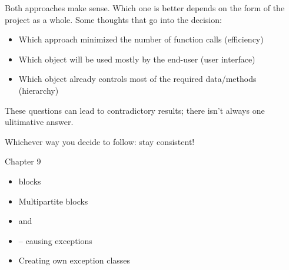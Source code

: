 \begin{frame}
%
\begin{hintbox}
Both approaches make sense. Which one is better depends on the form of the project as a whole. Some thoughts that go into the decision:

\vspace{6pt}
\begin{itemize}
\item Which approach minimized the number of function calls (\thus efficiency)
\item Which object will be used mostly by the end-user (\thus user interface)
\item Which object already controls most of the required data/methods \\
	(\thus hierarchy)
\end{itemize}

\vspace{6pt}
These questions can lead to contradictory results; there isn't always one ulitimative answer.

\vspace{6pt}
Whichever way you decide to follow: stay consistent!
\end{hintbox}
%
\end{frame}


\begin{frame}[fragile]{Chapter 9}
%
\begin{itemize}
\item {} blocks
\item Multipartite  blocks
\item {} and 
\item {} -- causing exceptions
\item Creating own exception classes
\end{itemize}
%
\end{frame}


